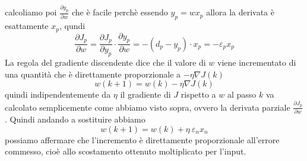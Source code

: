 calcoliamo poi $\frac{\partial y_p}{\partial w}$ che è facile perchè essendo $y_p = w x_p$ allora la derivata è esattamente $x_p$, qundi
\begin{equation}
\frac{\partial J_p}{\partial w} = \frac{\partial J_p}{\partial y_p} \cdot \frac{\partial y_p}{\partial w} = -(d_p - y_p) \cdot x_p = -\varepsilon_p x_p
\end{equation}
La regola del gradiente discendente dice che il valore di $w$ viene incrementato di una quantità che è direttamente proporzionale a $-\eta \nabla J(k)$
\begin{equation}
w(k+1) = w(k) - \eta \nabla J(k)
\end{equation}
quindi indipendentemente da $\eta$ il gradiente di $J$ rispetto a $w$ al passo $k$ va calcolato semplicemente come abbiamo visto sopra, ovvero la derivata parziale $\frac{\partial J_p}{\partial w}$. Quindi andando a sostituire abbiamo
\begin{equation}
w(k+1) = w(k) + \eta \  \varepsilon_n x_n 
\end{equation}
possiamo affermare che l'incremento è direttamente proporzionale all'errore commesso, cioè allo scostamento ottenuto moltiplicato per l'input. \\

